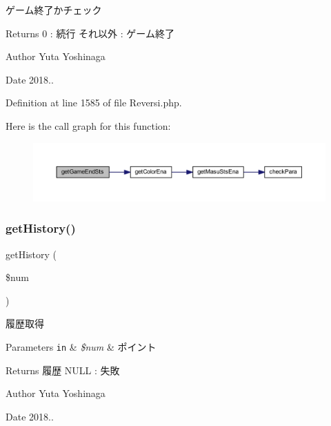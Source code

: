 ゲーム終了かチェック 

\begin{DoxyReturn}{Returns}
0 \+: 続行 それ以外 \+: ゲーム終了 
\end{DoxyReturn}
\begin{DoxyAuthor}{Author}
Yuta Yoshinaga 
\end{DoxyAuthor}
\begin{DoxyDate}{Date}
2018.. 
\end{DoxyDate}


Definition at line 1585 of file Reversi.\+php.

Here is the call graph for this function\+:
\nopagebreak
\begin{figure}[H]
\begin{center}
\leavevmode
\includegraphics[width=350pt]{class_reversi_aab9985c789e464de6cf99d7d725cb5a3_cgraph}
\end{center}
\end{figure}
\mbox{\label{class_reversi_a41cae82a798f2b3d0684bda44b837fcf}} 
\subsubsection{\texorpdfstring{get\+History()}{getHistory()}}
{\footnotesize\ttfamily get\+History (\begin{DoxyParamCaption}\item[{}]{\$num }\end{DoxyParamCaption})}



履歴取得 


\begin{DoxyParams}[1]{Parameters}
\mbox{\tt in}  & {\em \$num} & ポイント \\
\hline
\end{DoxyParams}
\begin{DoxyReturn}{Returns}
履歴 N\+U\+LL \+: 失敗 
\end{DoxyReturn}
\begin{DoxyAuthor}{Author}
Yuta Yoshinaga 
\end{DoxyAuthor}
\begin{DoxyDate}{Date}
2018.. 
\end{DoxyDate}


